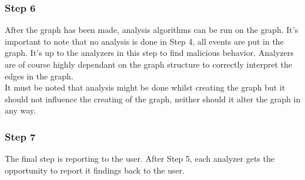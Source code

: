 



\subsubsection{Step 6}

After the graph has been made, analysis algorithms can be run on the graph. It's important to note that no analysis is done in Step 4, all events are put in the graph. It's up to the analyzers in this step to find malicious behavior. Analyzers are of course highly dependant on the graph structure to correctly interpret the edges in the graph.\\

It must be noted that analysis might be done whilst creating the graph but it should not influence the creating of the graph, neither should it alter the graph in any way.


\subsubsection{Step 7}

The final step is reporting to the user. After Step 5, each analyzer gets the opportunity to report it findings back to the user.





